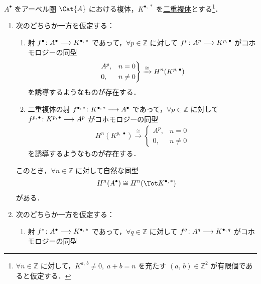 \documentclass[algtopo_main]{subfiles}
\begin{document}
\begin{mycol}[label=col:SS-double-complex, breakable]{}
    $A^\bullet$ をアーベル圏 $\Cat{A}$ における複体，$K^{\bullet,\, *}$ を\hyperref[def:double-complex]{二重複体}とする\footnote{$\forall n \in \mathbb{Z}$ に対して，$K^{a,\, b} \neq 0,\; a+b =n$ を充たす $(a,\, b) \in \mathbb{Z}^2$ が有限個であると仮定する．}．
    \begin{enumerate}
        \item 次のどちらか一方を仮定する：
        \begin{enumerate}
            \item 射 $f^{\bullet} \colon A^\bullet \longrightarrow K^{\bullet,\, *}$ であって，$\forall p \in \mathbb{Z}$ に対して $f^p \colon A^p \longrightarrow K^{p,\, \bullet}$ がコホモロジーの同型
            \begin{align}
                \begin{rcases}
                    A^p, & n=0 \\
                    0, & n\neq 0
                \end{rcases}
                \xrightarrow{\cong} H^n(K^{p,\, \bullet})
            \end{align}
            を誘導するようなものが存在する．
            \item 二重複体の射 $f^{\bullet,\, *} \colon K^{\bullet,\, *} \longrightarrow A^\bullet$ であって，$\forall p \in \mathbb{Z}$ に対して $f^{p,\, \bullet} \colon K^{p,\, \bullet} \longrightarrow A^p$ がコホモロジーの同型
            \begin{align}
                H^n(K^{p,\, \bullet}) \xrightarrow{\cong}
                \begin{cases}
                    A^p, & n=0 \\
                    0, & n\neq 0
                \end{cases}
            \end{align}
            を誘導するようなものが存在する．
        \end{enumerate}
        このとき，$\forall n \in \mathbb{Z}$ に対して自然な同型
        \begin{align}
            H^n(A^\bullet) \cong H^n (\Tot K^{\bullet,\, *})
        \end{align}
        がある．
        \item 次のどちらか一方を仮定する：
        \begin{enumerate}
            \item 射 $f^{*} \colon A^\bullet \longrightarrow K^{\bullet,\, *}$ であって，$\forall q \in \mathbb{Z}$ に対して $f^q \colon A^q \longrightarrow K^{\bullet,\, q}$ がコホモロジーの同型

\end{enumerate}
\end{enumerate}
\end{mycol}
\end{document}
